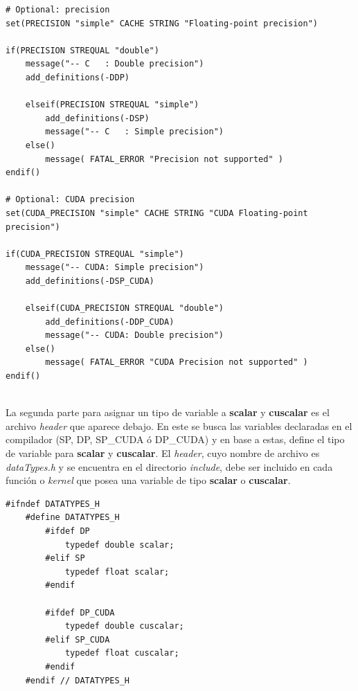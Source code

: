 \newpage
{\scriptsize
	\begin{frame}{}
		\begin{lstlisting}[frame=single]
# Optional: precision
set(PRECISION "simple" CACHE STRING "Floating-point precision")

if(PRECISION STREQUAL "double")
	message("-- C   : Double precision")
	add_definitions(-DDP)

	elseif(PRECISION STREQUAL "simple")
		add_definitions(-DSP)
		message("-- C   : Simple precision")
	else()
		message( FATAL_ERROR "Precision not supported" )
endif()

# Optional: CUDA precision
set(CUDA_PRECISION "simple" CACHE STRING "CUDA Floating-point precision")

if(CUDA_PRECISION STREQUAL "simple")
	message("-- CUDA: Simple precision")
	add_definitions(-DSP_CUDA)

	elseif(CUDA_PRECISION STREQUAL "double")
		add_definitions(-DDP_CUDA)
		message("-- CUDA: Double precision")
	else()
		message( FATAL_ERROR "CUDA Precision not supported" )
endif()
		
		\end{lstlisting}
		
	\end{frame}
}
La segunda parte para asignar un tipo de variable a \textbf{scalar} y \textbf{cuscalar} es el archivo \textit{header} que aparece debajo. En este se busca las variables declaradas en el compilador (SP, DP, SP\_CUDA ó DP\_CUDA) y en base a estas, define el tipo de variable para \textbf{scalar} y \textbf{cuscalar}. El \textit{header}, cuyo nombre de archivo es \textit{dataTypes.h} y se encuentra en el directorio \textit{include}, debe ser incluido en cada función o \textit{kernel} que posea una variable de tipo  \textbf{scalar} o \textbf{cuscalar}.

{\footnotesize
	\begin{frame}{}
		\begin{lstlisting}[frame=single]
	#ifndef DATATYPES_H
	#define DATATYPES_H
		#ifdef DP
			typedef double scalar;
		#elif SP
			typedef float scalar;
		#endif	
		
		#ifdef DP_CUDA
			typedef double cuscalar;
		#elif SP_CUDA
			typedef float cuscalar;
		#endif
	#endif // DATATYPES_H
		
		\end{lstlisting}
		
	\end{frame}
}
\newpage

